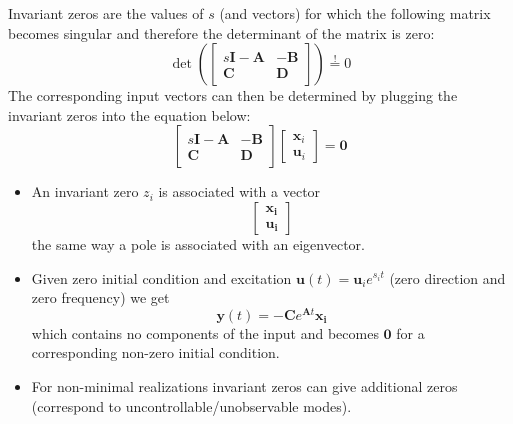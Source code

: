 Invariant zeros are the values of $s$ (and vectors) for which the following matrix becomes singular and therefore the determinant of the matrix is zero:
\begin{equation*}
    \det \left(\begin{bmatrix}
            s\mathbf{I}-\mathbf{A} & -\mathbf{B} \\
            \mathbf{C}             & \mathbf{D}
        \end{bmatrix}\right) \overset{!}{=}0
\end{equation*}
The corresponding input vectors can then be determined by plugging the invariant zeros into the equation below:
\begin{equation*}
    \begin{bmatrix}
        s\mathbf{I}-\mathbf{A} & -\mathbf{B} \\
        \mathbf{C}             & \mathbf{D}
    \end{bmatrix}
    \begin{bmatrix}
        \mathbf{x}_i \\
        \mathbf{u}_i
    \end{bmatrix}=\mathbf{0}
\end{equation*}


\begin{itemize}
    \item An invariant zero $z_i$ is associated with a vector
          \begin{equation*}
              \begin{bmatrix}
                  \mathbf{x_i} \\
                  \mathbf{u_i}
              \end{bmatrix}
          \end{equation*}
          the same way a pole is associated with an eigenvector.
    \item Given zero initial condition and excitation $\mathbf{u}(t)=\mathbf{u}_i e^{s_i t}$ (zero direction and zero frequency) we get
          \begin{equation*}
              \mathbf{y}(t)=-\mathbf{C}e^{\mathbf{A}t}\mathbf{x_i}
          \end{equation*} which contains no components of the input and becomes $\mathbf{0}$ for a corresponding non-zero initial condition.
    \item For non-minimal realizations invariant zeros can give additional zeros (correspond to uncontrollable/unobservable modes).
\end{itemize}


